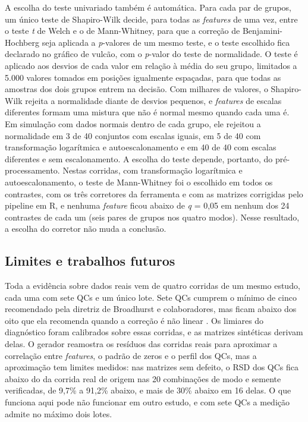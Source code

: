 A escolha do teste univariado também é automática. Para cada par de grupos, um único teste de Shapiro-Wilk \cite{shapiro1965analysis} decide, para todas as \emph{features} de uma vez, entre o teste \emph{t} de Welch e o de Mann-Whitney, para que a correção de Benjamini-Hochberg seja aplicada a \emph{p}-valores de um mesmo teste, e o teste escolhido fica declarado no gráfico de vulcão, com o \emph{p}-valor do teste de normalidade. O teste é aplicado aos desvios de cada valor em relação à média do seu grupo, limitados a 5.000 valores tomados em posições igualmente espaçadas, para que todas as amostras dos dois grupos entrem na decisão. Com milhares de valores, o Shapiro-Wilk rejeita a normalidade diante de desvios pequenos, e \emph{features} de escalas diferentes formam uma mistura que não é normal mesmo quando cada uma é. Em simulação com dados normais dentro de cada grupo, ele rejeitou a normalidade em 3 de 40 conjuntos com escalas iguais, em 5 de 40 com transformação logarítmica e autoescalonamento e em 40 de 40 com escalas diferentes e sem escalonamento. A escolha do teste depende, portanto, do pré-processamento. Nestas corridas, com transformação logarítmica e autoescalonamento, o teste de Mann-Whitney foi o escolhido em todos os contrastes, com os três corretores da ferramenta e com as matrizes corrigidas pelo pipeline em R, e nenhuma \emph{feature} ficou abaixo de \emph{q} = 0,05 em nenhum dos 24 contrastes de cada um (seis pares de grupos nos quatro modos). Nesse resultado, a escolha do corretor não muda a conclusão.

\subsection{Limites e trabalhos futuros}

Toda a evidência sobre dados reais vem de quatro corridas de um mesmo estudo, cada uma com sete QCs e um único lote. Sete QCs cumprem o mínimo de cinco recomendado pela diretriz de Broadhurst e colaboradores, mas ficam abaixo dos oito que ela recomenda quando a correção é não linear \cite{broadhurst2018guidelines}. Os limiares do diagnóstico foram calibrados sobre essas corridas, e as matrizes sintéticas derivam delas. O gerador reamostra os resíduos das corridas reais para aproximar a correlação entre \emph{features}, o padrão de zeros e o perfil dos QCs, mas a aproximação tem limites medidos: nas matrizes sem defeito, o RSD dos QCs fica abaixo do da corrida real de origem nas 20 combinações de modo e semente verificadas, de 9,7\% a 91,2\% abaixo, e mais de 30\% abaixo em 16 delas. O que funciona aqui pode não funcionar em outro estudo, e com sete QCs a medição admite no máximo dois lotes.

